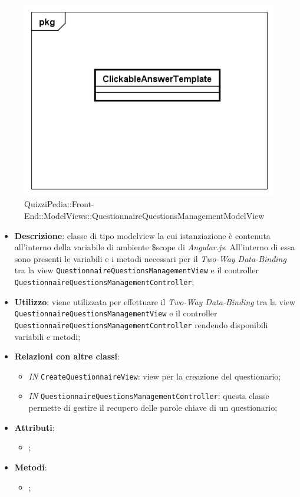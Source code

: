 					\begin{figure}[ht]
						\centering
						\includegraphics[scale=0.5,keepaspectratio]{UML/Classi/Front-End/QuizziPedia_Front-end_Templates_ClickableAnswerTemplate.png}
						\caption{QuizziPedia::Front-End::ModelViews::QuestionnaireQuestionsManagementModelView}
					\end{figure} \FloatBarrier
					
					\begin{itemize}
						\item \textbf{Descrizione}: classe di tipo modelview la cui istanziazione è contenuta all'interno della variabile di ambiente \$scope di \textit{Angular.js}. All'interno di essa sono presenti le variabili e i metodi necessari per il \textit{Two-Way Data-Binding} tra la view \texttt{QuestionnaireQuestionsManagementView} e il controller \texttt{QuestionnaireQuestionsManagementController};
						\item \textbf{Utilizzo}: viene utilizzata per effettuare il \textit{Two-Way Data-Binding} tra la view \texttt{QuestionnaireQuestionsManagementView} e il controller \texttt{QuestionnaireQuestionsManagementController} rendendo disponibili variabili e metodi;
						\item \textbf{Relazioni con altre classi}: 
						\begin{itemize}
							\item \textit{IN} \texttt{CreateQuestionnaireView}: view per la creazione del questionario; 
							\item \textit{IN} \texttt{QuestionnaireQuestionsManagementController}: questa classe permette di gestire il recupero delle parole chiave di un questionario;
						\end{itemize}
						\item \textbf{Attributi}: 
						\begin{itemize}
							\item ;
						\end{itemize}
						\item \textbf{Metodi}: 
						\begin{itemize}
							\item ;
						\end{itemize}
					\end{itemize}
					
